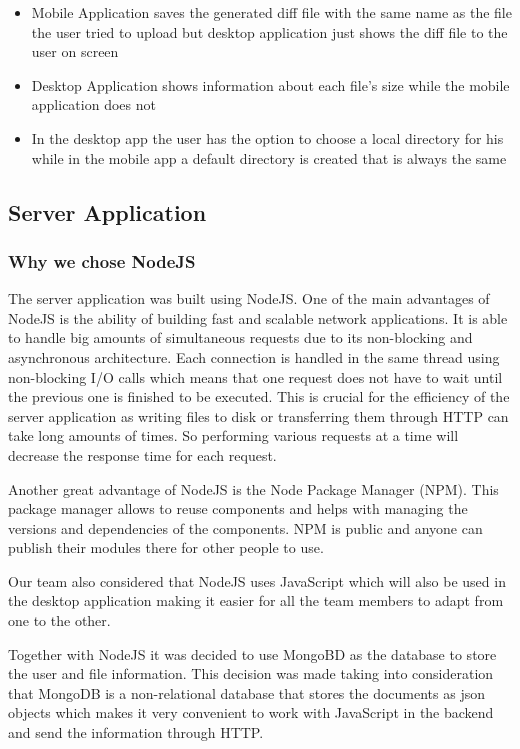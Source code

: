 \documentclass[11pt]{article}
\begin{document}
\begin{itemize}
	\item{Mobile Application saves the generated diff file with the same name as the file the user tried to upload but desktop application just shows the diff file to the user on screen}
	\item{Desktop Application shows information about each file's size while the mobile application does not}
	\item{In the desktop app the user has the option to choose a local directory for his while in the mobile app a default directory is created that is always the same}
\end{itemize}

\subsection{Server Application}

\subsubsection*{Why we chose NodeJS}

The server application was built using NodeJS. One of the main advantages of NodeJS is the ability of building fast and scalable network applications. It is able to handle big amounts of simultaneous requests due to its non-blocking and asynchronous architecture. Each connection is handled in the same thread using non-blocking I/O calls which means that one request does not have to wait until the previous one is finished to be executed. This is crucial for the efficiency of the server application as writing files to disk or transferring them through HTTP can take long amounts of times. So performing various requests at a time will decrease the response time for each request.

Another great advantage of NodeJS is the Node Package Manager (NPM). This package manager allows to reuse components and helps with managing the versions and dependencies of the components. NPM is public and anyone can publish their modules there for other people to use.

Our team also considered that NodeJS uses JavaScript which will also be used in the desktop application making it easier for all the team members to adapt from one to the other.

Together with NodeJS it was decided to use MongoBD as the database to store the user and file information. This decision was made taking into consideration that MongoDB is a non-relational database that stores the documents as json objects which makes it very convenient to work with JavaScript in the backend and send the information through HTTP.
\end{document}

